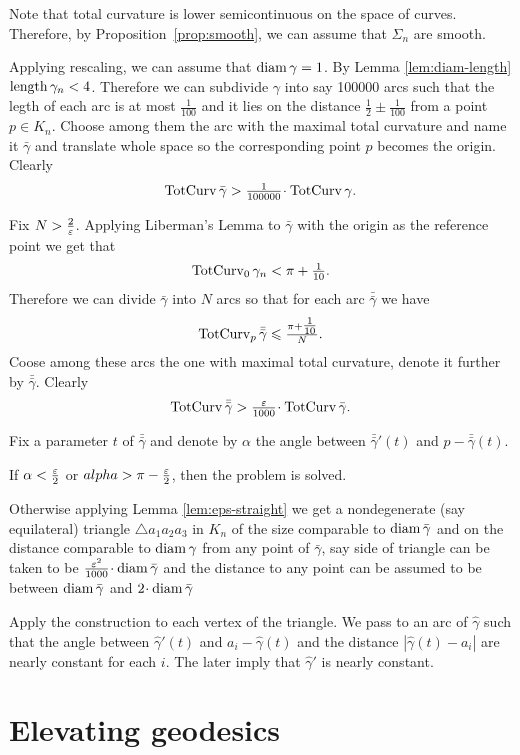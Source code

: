 \documentclass[a4paper,10pt]{amsart}
\begin{document}
Note that total curvature is lower semicontinuous on the space of curves.
Therefore, by Proposition~\ref{prop:smooth}, we can assume that $\Sigma_n$ are smooth.

Applying rescaling, we can assume that $\operatorname{diam}\gamma=1$.
By Lemma \ref{lem:diam-length} $\length\gamma_n\zz<4$.
Therefore we can subdivide $\gamma$ into say 100000 arcs
such that the legth of each arc is at most $\tfrac1{100}$
and it lies on the distance $\tfrac12\pm \tfrac1{100}$ 
from a point $p\in K_n$.
Choose among them the arc with the maximal total curvature and 
name it $\bar\gamma$ and translate whole space so the corresponding point $p$ becomes the origin.
Clearly
\[\tc\bar\gamma>\tfrac1{100000}\cdot \tc\gamma.\]

Fix $N>\tfrac2{\varepsilon}$.
Applying Liberman's Lemma to $\bar\gamma$ with the origin as the reference point 
we get that \[\mathop{\rm TotCurv}\nolimits_0\gamma_n<\pi+\tfrac1{10}.\]
Therefore we can divide $\bar\gamma$ into $N$ arcs 
so that for each arc $\bar{\bar\gamma}$
we have \[\mathop{\rm TotCurv}\nolimits_p\bar{\bar\gamma}\leqslant \tfrac{\pi+\tfrac1{10}}{N}.\]
Coose among these arcs the one with maximal total curvature,
denote it further by $\bar{\bar\gamma}$.
Clearly 
\[\tc\bar{\bar\gamma}>\tfrac\eps{1000}\cdot \tc\bar\gamma.\]

Fix a parameter $t$ of $\bar{\bar\gamma}$
and denote by $\alpha$ the angle between $\bar{\bar\gamma}'(t)$ and $p-\bar{\bar\gamma}(t)$.

If $\alpha<\tfrac{\varepsilon}2$ or $alpha>\pi-\tfrac{\varepsilon}2$,
then the problem is solved.

Otherwise 
applying Lemma \ref{lem:eps-straight} we get a nondegenerate (say equilateral) 
triangle $\triangle a_1a_2a_3$ in $K_n$ 
of the size comparable to $\operatorname{diam} \bar\gamma$ 
and on the distance comparable to $\operatorname{diam} \gamma$ from any point of $\bar\gamma$,
say side of triangle can be taken to be $\tfrac{\eps^2}{1000}\cdot\diam \bar\gamma$
and the distance to any point can be assumed to be between $\operatorname{diam} \bar\gamma$ and $2\cdot \diam \bar\gamma$

Apply the construction to each vertex of the triangle.
We pass to an arc of $\hat\gamma$
such that the angle between $\hat\gamma'(t)$ and $a_i-\hat\gamma(t)$ 
and the distance $|\hat\gamma(t)-a_i|$
are nearly constant for each $i$.
The later imply that $\hat\gamma'$ is nearly constant.
\qeds


\section{Elevating geodesics}
\end{document}
